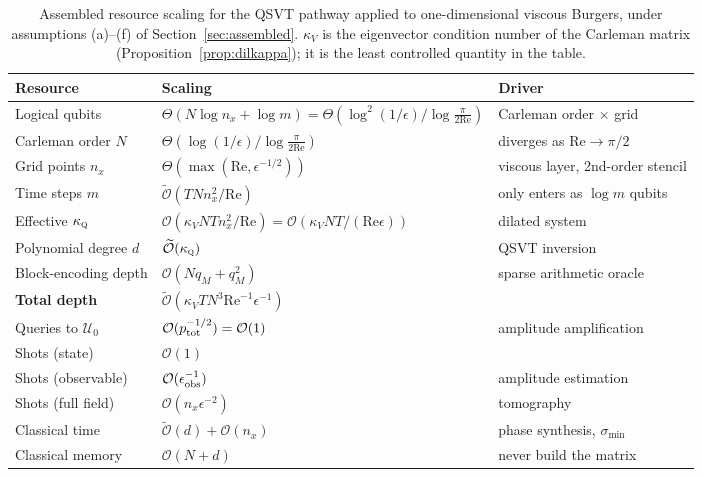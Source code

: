 \documentclass[11pt,a4paper]{article}
\theoremstyle{plain}
\theoremstyle{definition}
\theoremstyle{remark}
\newcommand{\Rey}{\mathrm{Re}}
\newcommand{\Oh}{\mathcal{O}}
\newcommand{\Ot}{\widetilde{\mathcal{O}}}
\newcommand{\kQ}{\kappa_{\textsc{q}}}
\begin{document}
\begin{table}[htbp]
\centering
\caption{Assembled resource scaling for the QSVT pathway applied to
one-dimensional viscous Burgers, under assumptions (a)--(f) of
Section~\ref{sec:assembled}.  $\kappa_V$ is the eigenvector condition number of
the Carleman matrix (Proposition~\ref{prop:dilkappa}); it is the least
controlled quantity in the table.}
\label{tab:assembled}
\footnotesize
\begin{tabular}{@{}l>{\raggedright\arraybackslash}p{7.4cm}l@{}}
\toprule
Resource & Scaling & Driver\\
\midrule
Logical qubits & $\Theta\!\left(N\log n_x+\log m\right)
= \Theta\!\left(\log^2(1/\epsilon)/\log\tfrac{\pi}{2\Rey}\right)$ & Carleman order $\times$ grid\\
Carleman order $N$ & $\Theta\!\left(\log(1/\epsilon)\big/\log\tfrac{\pi}{2\Rey}\right)$ & diverges as $\Rey\to\pi/2$\\
Grid points $n_x$ & $\Theta\!\left(\max(\Rey,\epsilon^{-1/2})\right)$ & viscous layer, 2nd-order stencil\\
Time steps $m$ & $\Ot\!\left(TNn_x^2/\Rey\right)$ & only enters as $\log m$ qubits\\
Effective $\kQ$ & $\Oh\!\left(\kappa_V N T n_x^2/\Rey\right)=\Oh(\kappa_V NT/(\Rey\epsilon))$ & dilated system\\
Polynomial degree $d$ & $\Ot(\kQ)$ & QSVT inversion\\
Block-encoding depth & $\Oh(Nq_M+q_M^2)$ & sparse arithmetic oracle\\
\textbf{Total depth} & $\Ot\!\left(\kappa_V T N^{3}\Rey^{-1}\epsilon^{-1}\right)$ & \\
Queries to $\mathcal{U}_0$ & $\Oh(p_{\rm tot}^{-1/2})=\Oh(1)$ & amplitude amplification\\
Shots (state) & $\Oh(1)$ & \\
Shots (observable) & $\Oh(\epsilon_{\rm obs}^{-1})$ & amplitude estimation\\
Shots (full field) & $\Oh(n_x\epsilon^{-2})$ & tomography\\
Classical time & $\Ot(d)+\Oh(n_x)$ & phase synthesis, $\sigma_{\min}$\\
Classical memory & $\Oh(N+d)$ & never build the matrix\\
\bottomrule
\end{tabular}
\end{table}
\end{document}
